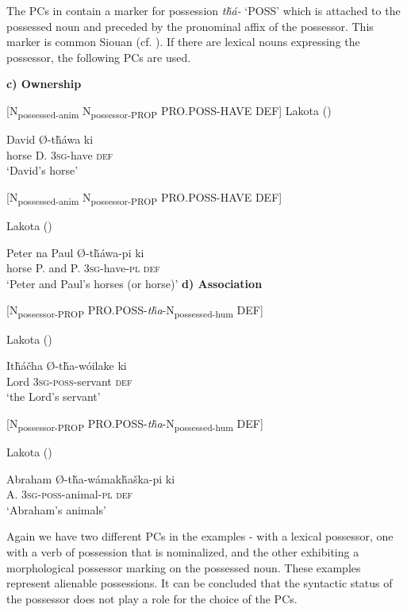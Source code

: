 \documentclass[output=paper]{LSP/langsci}
\begin{document}
The PCs in  contain a marker for possession \textit{t\v{h}á-} `POSS' which is attached to the possessed noun and preceded by the pronominal affix of the possessor. This marker is common Siouan (cf. \citealt{RankinEtAl2015AccessMay}). If there are lexical nouns expressing the possessor, the following PCs are used.

\vspace{1em}
\textbf{c)	Ownership}

[N\textsubscript{possessed-anim} N\textsubscript{possessor-PROP} PRO.POSS-HAVE DEF] 
\ea	Lakota (\citealt[91]{Buechel1939}) \label{lakotadavidshorse}

   David   Ø-t\v{h}áwa    ki \\
horse      D.   \textsc{3sg}-have  \textsc{def} \\
\glt `David's horse'
\z

[N\textsubscript{possessed-anim} N\textsubscript{possessor-PROP} PRO.POSS-HAVE DEF]

\ea Lakota (\citealt[91]{Buechel1939})

 Peter  na  Paul   Ø-t\v{h}áwa-pi     ki  \\
horse    P.       and P.      \textsc{3sg}-have-\textsc{pl} \textsc{def} \\
\glt `Peter and Paul's horses (or horse)'
\z
\textbf{d)	Association}

[N\textsubscript{possessor-PROP} PRO.POSS-\textit{t\v{h}a}-N\textsubscript{possessed-hum} DEF]

\ea	Lakota (\citealt[92]{Buechel1939})

\gll It\v{h}\'a\v{c}ha    Ø-t\v{h}a-wóilake   ki  \\
Lord   \textsc{3sg-poss}-servant   \textsc{def} \\
\glt `the Lord's servant'
\z

[N\textsubscript{possessor-PROP} PRO.POSS-\textit{t\v{h}a}-N\textsubscript{possessed-hum} DEF]

\ea	Lakota (\citealt[92]{Buechel1939}) \label{lakotaabraham}

\gll Abraham Ø-t\v{h}a-w\'amak\v{h}a\v{s}ka-pi ki  \\
 A. \textsc{3sg-poss}-animal-\textsc{pl}  \textsc{def} \\
\glt `Abraham's animals'
\z

Again we have two different PCs in the examples - with a lexical possessor, one with a verb of possession that is nominalized, and the other exhibiting a morphological possessor marking on the possessed noun. These examples represent alienable possessions. It can be concluded that the syntactic status of the possessor does not play a role for the choice of the PCs.
\end{document}
